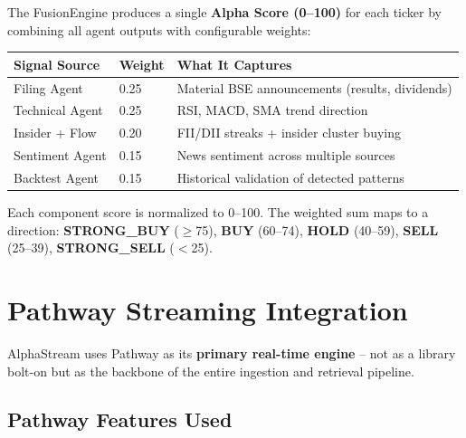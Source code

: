 \documentclass[11pt, a4paper]{article}
\begin{document}
The FusionEngine produces a single \textbf{Alpha Score (0--100)} for each ticker by
combining all agent outputs with configurable weights:

\begin{center}
\small
\begin{tabular}{L{4cm} C{2cm} L{6.5cm}}
  \toprule
  \textbf{Signal Source} & \textbf{Weight} & \textbf{What It Captures} \\
  \midrule
  Filing Agent        & 0.25 & Material BSE announcements (results, dividends) \\
  Technical Agent     & 0.25 & RSI, MACD, SMA trend direction \\
  Insider + Flow      & 0.20 & FII/DII streaks + insider cluster buying \\
  Sentiment Agent     & 0.15 & News sentiment across multiple sources \\
  Backtest Agent      & 0.15 & Historical validation of detected patterns \\
  \bottomrule
\end{tabular}
\end{center}

\noindent
Each component score is normalized to 0--100. The weighted sum maps to a direction:
\textbf{STRONG\_BUY} ($\geq$75), \textbf{BUY} (60--74), \textbf{HOLD} (40--59),
\textbf{SELL} (25--39), \textbf{STRONG\_SELL} ($<$25).

\section{Pathway Streaming Integration}

AlphaStream uses Pathway as its \textbf{primary real-time engine} -- not as a library
bolt-on but as the backbone of the entire ingestion and retrieval pipeline.

\subsection{Pathway Features Used}
\end{document}
